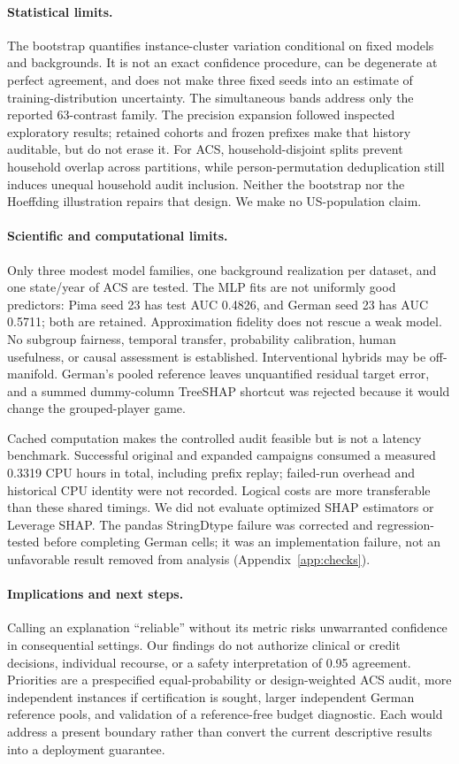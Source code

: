 \documentclass{article}
\begin{document}
\paragraph{Statistical limits.}
The bootstrap quantifies instance-cluster variation conditional on fixed models and backgrounds. It is not an exact confidence procedure, can be degenerate at perfect agreement, and does not make three fixed seeds into an estimate of training-distribution uncertainty. The simultaneous bands address only the reported 63-contrast family. The precision expansion followed inspected exploratory results; retained cohorts and frozen prefixes make that history auditable, but do not erase it. For ACS, household-disjoint splits prevent household overlap across partitions, while person-permutation deduplication still induces unequal household audit inclusion. Neither the bootstrap nor the Hoeffding illustration repairs that design. We make no US-population claim.

\paragraph{Scientific and computational limits.}
Only three modest model families, one background realization per dataset, and one state/year of ACS are tested. The MLP fits are not uniformly good predictors: Pima seed 23 has test AUC 0.4826, and German seed 23 has AUC 0.5711; both are retained. Approximation fidelity does not rescue a weak model. No subgroup fairness, temporal transfer, probability calibration, human usefulness, or causal assessment is established. Interventional hybrids may be off-manifold. German's pooled reference leaves unquantified residual target error, and a summed dummy-column TreeSHAP shortcut was rejected because it would change the grouped-player game.

Cached computation makes the controlled audit feasible but is not a latency benchmark. Successful original and expanded campaigns consumed a measured 0.3319 CPU hours in total, including prefix replay; failed-run overhead and historical CPU identity were not recorded. Logical costs are more transferable than these shared timings. We did not evaluate optimized SHAP estimators or Leverage SHAP. The pandas StringDtype failure was corrected and regression-tested before completing German cells; it was an implementation failure, not an unfavorable result removed from analysis (Appendix~\ref{app:checks}).

\paragraph{Implications and next steps.}
Calling an explanation ``reliable'' without its metric risks unwarranted confidence in consequential settings. Our findings do not authorize clinical or credit decisions, individual recourse, or a safety interpretation of 0.95 agreement. Priorities are a prespecified equal-probability or design-weighted ACS audit, more independent instances if certification is sought, larger independent German reference pools, and validation of a reference-free budget diagnostic. Each would address a present boundary rather than convert the current descriptive results into a deployment guarantee.
\end{document}
